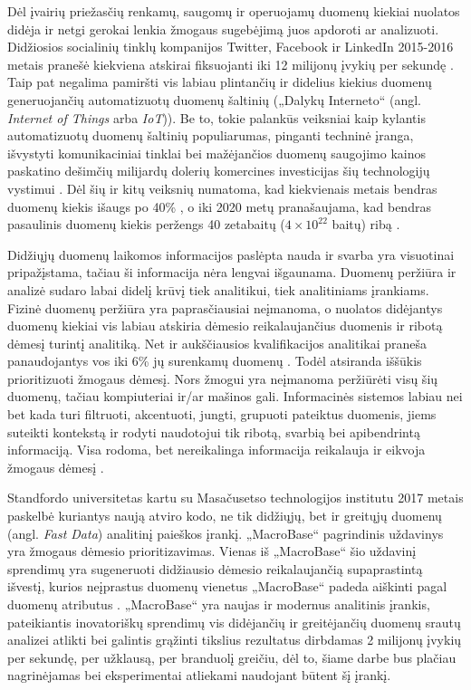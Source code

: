 \documentclass{VUMIFPSkursinis}
\begin{document}
Dėl įvairių priežasčių renkamų, saugomų ir operuojamų duomenų kiekiai nuolatos didėja ir netgi gerokai lenkia žmogaus sugebėjimą juos apdoroti ar analizuoti. Didžiosios socialinių tinklų kompanijos Twitter, Facebook ir LinkedIn 2015-2016 metais pranešė kiekviena atskirai fiksuojanti iki 12 milijonų įvykių per sekundę \cite{twitter, facebook, linkedin}. Taip pat negalima pamiršti vis labiau plintančių ir didelius kiekius duomenų generuojančių automatizuotų duomenų šaltinių („Dalykų Interneto“ (angl. \textit{Internet of Things} arba \textit{IoT})). Be to, tokie palankūs veiksniai kaip kylantis automatizuotų duomenų šaltinių populiarumas, pinganti techninė įranga, išvystyti komunikaciniai tinklai bei mažėjančios duomenų saugojimo kainos paskatino dešimčių milijardų dolerių komercines investicijas šių technologijų vystimui \cite{iot_investments}. Dėl šių ir kitų veiksnių numatoma, kad kiekvienais metais bendras duomenų kiekis išaugs po 40\% \cite{iot}, o iki 2020 metų pranašaujama, kad bendras pasaulinis duomenų kiekis peržengs 40 zetabaitų ($4\times{10}^{22}$ baitų) ribą \cite{future_data_volume}.\par

Didžiųjų duomenų laikomos informacijos paslėpta nauda ir svarba yra visuotinai pripažįstama, tačiau ši informacija nėra lengvai išgaunama. Duomenų peržiūra ir analizė sudaro labai didelį krūvį tiek analitikui, tiek analitiniams įrankiams. Fizinė duomenų peržiūra yra paprasčiausiai neįmanoma, o nuolatos didėjantys duomenų kiekiai vis labiau atskiria dėmesio reikalaujančius duomenis ir ribotą dėmesį turintį analitiką. Net ir aukščiausios kvalifikacijos analitikai praneša panaudojantys vos iki 6\% jų surenkamų duomenų \cite{prioritizing_attention}. Todėl atsiranda iššūkis prioritizuoti žmogaus dėmesį. Nors žmogui yra neįmanoma peržiūrėti visų šių duomenų, tačiau kompiuteriai ir/ar mašinos gali. Informacinės sistemos labiau nei bet kada turi filtruoti, akcentuoti, jungti, grupuoti pateiktus duomenis, jiems suteikti kontekstą ir rodyti naudotojui tik ribotą, svarbią bei apibendrintą informaciją. Visa rodoma, bet nereikalinga informacija reikalauja ir eikvoja žmogaus dėmesį \cite{attention}.\par

Standfordo universitetas kartu su Masačusetso technologijos institutu 2017 metais paskelbė kuriantys naują atviro kodo, ne tik didžiųjų, bet ir greitųjų duomenų (angl. \textit{Fast Data}) analitinį paieškos įrankį. „MacroBase“ pagrindinis uždavinys yra žmogaus dėmesio prioritizavimas. Vienas iš „MacroBase“ šio uždavinį sprendimų yra sugeneruoti didžiausio dėmesio reikalaujančią supaprastintą išvestį, kurios neįprastus duomenų vienetus „MacroBase“ padeda aiškinti pagal duomenų atributus \cite{macrobase_overview, prioritizing_attention}. „MacroBase“ yra naujas ir modernus analitinis įrankis, pateikiantis inovatoriškų sprendimų vis didėjančių ir greitėjančių duomenų srautų analizei atlikti bei galintis grąžinti tikslius rezultatus dirbdamas 2 milijonų įvykių per sekundę, per užklausą, per branduolį greičiu, dėl to, šiame darbe bus plačiau nagrinėjamas bei eksperimentai atliekami naudojant būtent šį įrankį.
\end{document}
